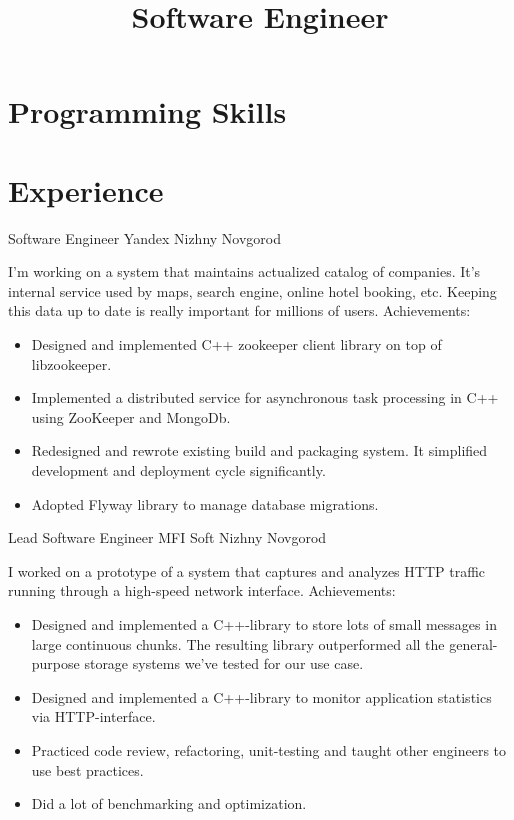 \documentclass[11pt,a4paper,sans]{moderncv}
\title{Software Engineer}
\begin{document}
\makecvtitle

\section{Programming Skills}

\section{Experience}
{Software Engineer}
{Yandex}
{Nizhny Novgorod}
{}
{I'm working on a system that maintains actualized catalog of
companies.  It's internal service used by maps, search engine, online
hotel booking, etc.  Keeping this data up to date is really important
for millions of users.
\newline{}
Achievements:
\begin{itemize}
\item Designed and implemented C++ zookeeper client library on top of
  libzookeeper.
\item Implemented a distributed service for asynchronous task
  processing in C++ using ZooKeeper and MongoDb.
\item Redesigned and rewrote existing build and packaging system. It
  simplified development and deployment cycle significantly.
\item Adopted Flyway library to manage database migrations.
\end{itemize}
}

{Lead Software Engineer}
{MFI Soft}
{Nizhny Novgorod}
{}
{I worked on a prototype of a system that captures and analyzes HTTP
traffic running through a high-speed network interface.
\newline{}
Achievements:
\begin{itemize}
\item Designed and implemented a C++-library to store lots of small
  messages in large continuous chunks. The resulting library
  outperformed all the general-purpose storage systems we've tested
  for our use case.
\item Designed and implemented a C++-library to monitor application
  statistics via HTTP-interface.
\item Practiced code review, refactoring, unit-testing and taught
  other engineers to use best practices.
\item Did a lot of benchmarking and optimization.
\end{itemize}
}
\end{document}
